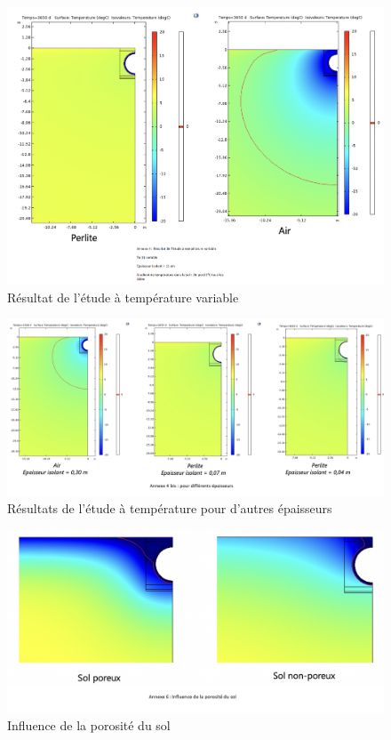 \documentclass[11pt,french,a4paper]{article}
\begin{document}
\begin{figure}[h]
\centering
\includegraphics[width=.8\linewidth]{image/annexe/reservoir_ent/Annexe_4.png}
\caption{Résultat de l'étude à température variable}
\end{figure}
   
\begin{figure}[h]
\centering
\includegraphics[width=.8\linewidth]{image/annexe/reservoir_ent/Annexe_4_bis.png}
\caption{Résultats de l'étude à température pour d'autres épaisseurs}
\end{figure}
  
  
\begin{figure}[!h]
\centering
\includegraphics[width=.8\linewidth]{image/annexe/reservoir_ent/Annexe_6.png}
\caption{Influence de la porosité du sol}
\end{figure}
   
\end{document}
